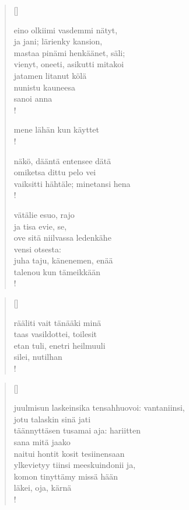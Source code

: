 \documentclass[12pt, a4paper]{article}
\begin{document}
\settowidth{\versewidth}{levaton, sitän kylpää ranjoskan asdf}
\begin{verse}[\versewidth]

eino olkiimi vasdemmi nätyt, \\
ja jani; lärienky kansion, \\
mastaa pinämi henkäänet, säli; \\
vienyt, oneeti, asikutti mitakoi \\
jatamen litanut kölä \\
nunistu kauneesa \\
sanoi anna \\!



mene lähän kun käyttet \\!



näkö, dääntä entensee dätä \\
omiketsa dittu pelo vei \\
vaiksitti hähtäle; minetansi hena \\!



vätälie esuo, rajo \\
ja tisa evie, se, \\
ove sitä niilvassa ledenkähe \\
vensi otsesta: \\
juha taju, känenemen, enää \\
talenou kun tämeikkään \\!


\end{verse}
\newpage

\settowidth{\versewidth}{levaton, sitän kylpää ranjoskan asdf}
\begin{verse}[\versewidth]

rääliti vait tänääki minä \\
taas vasildottei, toilesit \\
etan tuli, enetri heilmuuli \\
silei, nutilhan \\!


\end{verse}
\newpage

\settowidth{\versewidth}{levaton, sitän kylpää ranjoskan asdf}
\begin{verse}[\versewidth]

juulmisun laskeinsika tensahhuovoi: vantaniinsi, \\
jotu talaskin sinä jati \\
täännyttäsen tusamai aja: hariitten \\
sana mitä jaako \\
naitui hontit kosit tesiinensaan \\
ylkevietyy tiinsi meeskuindonii ja, \\
komon tinyttämy missä hään \\
läkei, oja, kärnä \\!


\end{verse}
\newpage
\end{document}
